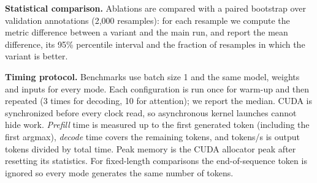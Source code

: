 \textbf{Statistical comparison.} Ablations are compared with a paired bootstrap over validation
annotations (2,000 resamples): for each resample we compute the metric difference between a variant
and the main run, and report the mean difference, its 95\% percentile interval and the fraction of
resamples in which the variant is better.

\textbf{Timing protocol.} Benchmarks use batch size 1 and the same model, weights and inputs for every
mode. Each configuration is run once for warm-up and then repeated (3 times for decoding, 10 for
attention); we report the median. CUDA is synchronized before every clock read, so asynchronous
kernel launches cannot hide work. \emph{Prefill} time is measured up to the first generated token
(including the first argmax), \emph{decode} time covers the remaining tokens, and tokens/s is output
tokens divided by total time. Peak memory is the CUDA allocator peak after resetting its statistics.
For fixed-length comparisons the end-of-sequence token is ignored so every mode generates the same
number of tokens.
